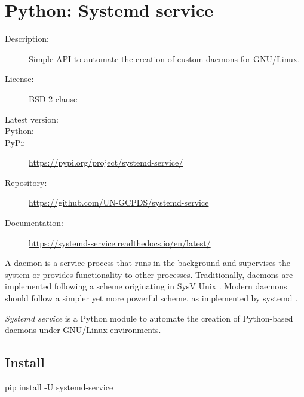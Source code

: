 \chapter{Python: Systemd service}\label{appendix:python_systemd_service}

\begin{description}
   \item[Description:]      Simple API to automate the creation of custom daemons for GNU/Linux.
   \item[License:]          BSD-2-clause
   \item[Latest version:]   
   \item[Python:]           
   \item[PyPi:]             \url{https://pypi.org/project/systemd-service/}
   \item[Repository:]       \url{https://github.com/UN-GCPDS/systemd-service}
   \item[Documentation:]    \url{https://systemd-service.readthedocs.io/en/latest/}
\end{description}
\hrulefill

A daemon is a service process that runs in the background and supervises the system or provides functionality to other processes. Traditionally, daemons are implemented following a scheme originating in SysV Unix \cite{daemon73:online}. Modern daemons should follow a simpler yet more powerful scheme, as implemented by systemd \cite{systemd78:online}.

\textit{Systemd service} is a Python module to automate the creation of Python-based daemons under GNU/Linux environments.


\section{Install}
\begin{python}
pip install -U systemd-service
\end{python}


